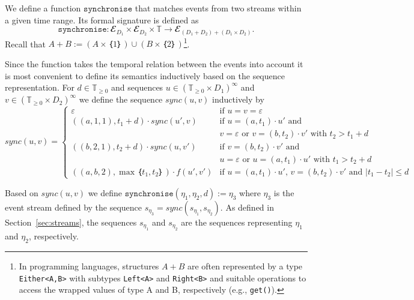 We define a function $\mathtt{synchronise}$ that matches events from two streams within a given time range.
Its formal signature is defined as
\[
  \mathtt{synchronise}: 𝓔_{D_1} × 𝓔_{D_2} × 𝕋 → 𝓔_{(D_1+D_2)+(D_1×D_2)}.
\]
Recall that $A+B:= (A×｛1｝)∪(B×｛2｝)$\footnote{In programming languages, structures $A+B$ are often represented by a type \texttt{Either<A,B>} with subtypes \texttt{Left<A>} and \texttt{Right<B>} and suitable operations to access the wrapped values of type A and B, respectively (e.g., \texttt{get()}).}.

Since the function takes the temporal relation between the events into account it is most convenient to define its semantics inductively based on the sequence representation.
For $d∈𝕋_{≥0}$ and sequences $u∈(𝕋_{≥0}×D_1)^∞$ and $v∈(𝕋_{≥0}×D_2)^∞$ we define the sequence $sync(u,v)$ inductively by 
\[
sync(u,v) = \begin{cases}
  ε & \text{if } u=v=ε \\
  ((a,1,1),t_1+d) · sync(u',v) & \text{if } u=(a,t_1) ·u' \text{ and } \\
                                   & v=ε \text{ or } v=(b,t_2)·v' \text{ with } t_2>t_1+d\\
  ((b,2,1),t_2+d) · sync(u,v') & \text{if } v=(b,t_2)·v' \text{ and } \\
                                   & u=ε \text{ or } u=(a,t_1)·u' \text{ with } t_1>t_2+d\\
  ((a,b,2),\max｛t_1,t_2｝) · f(u',v') & \text{if } u=(a,t_1)·u' \text{, } v=(b,t_2)·v' \text{ and } |t_1-t_2|≤d
\end{cases}
\]

Based on $sync(u,v)$ we define $\mathtt{synchronise}(η_1,η_2,d) := η_3$ where $η_3$ is the event stream defined by the sequence $s_{η_3} = sync(s_{η_1}, s_{η_2})$. 
As defined in Section~\ref{sec:streams}, the sequences $s_{η_1}$ and $s_{η_2}$ are the sequences representing $η_1$ and $η_2$, respectively.


